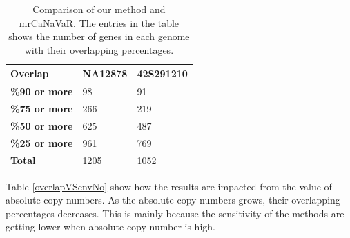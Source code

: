 \begin{table}[!htbp]
    \centering
    \begin{tabular}{lll}
    \hline
    \textbf{Overlap}             & \textbf{NA12878} & \textbf{42S291210}   \\ \hline
    \textbf{\%90 or more} & 98      & 91   \\
    \textbf{\%75 or more} & 266     & 219  \\
    \textbf{\%50 or more} & 625     & 487  \\
    \textbf{\%25 or more} & 961      & 769   \\ \hline
    \textbf{Total}        & 1205    & 1052 \\ \hline
    \end{tabular}
    \caption{Comparison of our method and mrCaNaVaR. The entries in the table shows the number of genes in each genome with their overlapping percentages.}
    \label{overlapTable}
\end{table}

Table \ref{overlapVScnvNo} show how the results are impacted from the value of absolute copy numbers. As the absolute copy numbers grows, their overlapping percentages decreases. This is mainly because the sensitivity of the methods are getting lower when absolute copy number is high.

